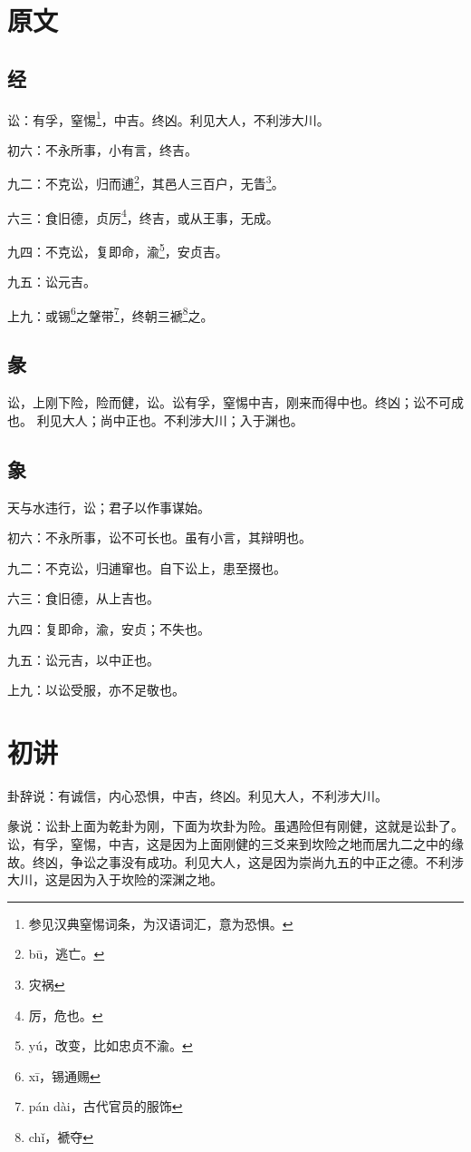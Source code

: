 \documentclass[12pt,oneside]{book}
\begin{document}
\section{原文}
\subsection{经}
讼：有孚，窒惕\footnote{参见汉典窒惕词条，为汉语词汇，意为恐惧。}，中吉。终凶。利见大人，不利涉大川。

初六：不永所事，小有言，终吉。

九二：不克讼，归而逋\footnote{bū，逃亡。}，其邑人三百户，无眚\footnote{灾祸}。

六三：食旧德，贞厉\footnote{厉，危也。}，终吉，或从王事，无成。

九四：不克讼，复即命，渝\footnote{yú，改变，比如忠贞不渝。}，安贞吉。

九五：讼元吉。

上九：或锡\footnote{xī，锡通赐}之鞶带\footnote{pán dài，古代官员的服饰}，终朝三褫\footnote{chǐ，褫夺}之。

\subsection{彖}
讼，上刚下险，险而健，讼。讼有孚，窒惕中吉，刚来而得中也。终凶；讼不可成也。 利见大人；尚中正也。不利涉大川；入于渊也。

\subsection{象}
天与水违行，讼；君子以作事谋始。

初六：不永所事，讼不可长也。虽有小言，其辩明也。

九二：不克讼，归逋窜也。自下讼上，患至掇也。

六三：食旧德，从上吉也。

九四：复即命，渝，安贞；不失也。

九五：讼元吉，以中正也。

上九：以讼受服，亦不足敬也。


\section{初讲}
卦辞说：有诚信，内心恐惧，中吉，终凶。利见大人，不利涉大川。

彖说：讼卦上面为乾卦为刚，下面为坎卦为险。虽遇险但有刚健，这就是讼卦了。讼，有孚，窒惕，中吉，这是因为上面刚健的三爻来到坎险之地而居九二之中的缘故。终凶，争讼之事没有成功。利见大人，这是因为崇尚九五的中正之德。不利涉大川，这是因为入于坎险的深渊之地。
\end{document}
